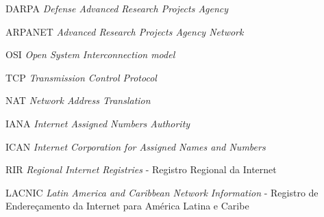 \begin{siglas}

	\item[DARPA]    \textit{Defense Advanced Research Projects Agency}
	\item[ARPANET]  \textit{Advanced Research Projects Agency Network}
	\item[OSI]      \textit{Open System Interconnection model}
	\item[TCP]      \textit{Transmission Control Protocol}
	\item[NAT]      \textit{Network Address Translation}
	\item[IANA]     \textit{Internet Assigned Numbers Authority}
	\item[ICAN]     \textit{Internet Corporation for Assigned Names and Numbers}
	\item[RIR]      \textit{Regional Internet Registries} - Registro Regional da Internet
	\item[LACNIC]   \textit{Latin America and Caribbean Network Information} - Registro de Endereçamento da Internet para América Latina e Caribe
	\item[]      \textit{}

\end{siglas}

